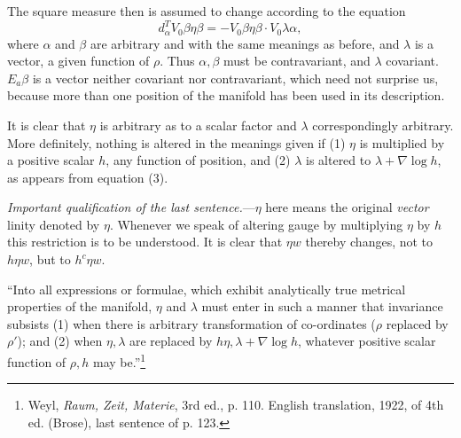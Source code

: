 \documentclass[11pt]{article}
\begin{document}
\indent The square measure then is assumed to change according to the equation
\begin{equation}d_\alpha^T V_0\beta\eta\beta=-V_0\beta\eta\beta\cdot V_0\lambda\alpha,\tag{3}\end{equation}
where $\alpha$ and $\beta$ are arbitrary and with the same meanings as before, and $\lambda$ is a vector, a given function of $\rho$. Thus $\alpha,\beta$ must be contravariant, and $\lambda$ covariant. $E_a\beta$ is a vector neither covariant nor contravariant, which need not surprise us, because more than one position of the manifold has been used in its description.

\indent It is clear that $\eta$ is arbitrary as to a scalar factor and $\lambda$ correspondingly arbitrary. More definitely, nothing is altered in the meanings given if (1) $\eta$ is multiplied by a positive scalar $h$, any function of position, and (2) $\lambda$ is altered to $\lambda+\nabla\log h$, as appears from equation (3).


\indent \emph{Important qualification of the last sentence.}---$\eta$ here means the original \emph{vector} linity denoted by $\eta$. Whenever we speak of altering gauge by multiplying $\eta$ by $h$ this restriction is to be understood. It is clear that $\eta w$ thereby changes, not to $h\eta w$, but to $h^c\eta w$.

\indent ``Into all expressions or formulae, which exhibit analytically true metrical properties of the manifold, $\eta$ and $\lambda$ must enter in such a manner that invariance subsists (1) when there is arbitrary transformation of co-ordinates ($\rho$ replaced by $\rho'$); and (2) when $\eta,\lambda$ are replaced by $h\eta,\lambda+\nabla\log h$, whatever positive scalar function of $\rho,h$ may be.''\footnote{Weyl, \emph{Raum, Zeit, Materie}, 3rd ed., p. 110. English translation, 1922, of 4th ed. (Brose), last sentence of p. 123.}
\end{document}
